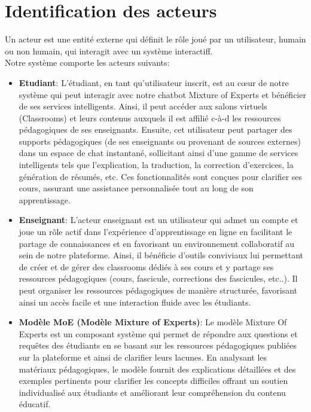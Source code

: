\section{Identification des acteurs}
\justifying
Un acteur est une entité externe qui définit le rôle joué par un utilisateur, humain ou non humain, qui interagit avec un système interactiff. \cite{acteur}\\
Notre système comporte les acteurs suivants:
\begin{itemize}[itemsep=2pt, parsep=2pt]
    \item \textbf{Etudiant}: L'étudiant, en tant qu'utilisateur inscrit, est au cœur de notre système qui peut interagir avec notre chatbot Mixture of Experts et bénéficier de ses services intelligents. Ainsi, il peut accéder aux salons virtuels (Classrooms) et leurs contenus auxquels il est affilié  c-à-d les ressources pédagogiques de ses enseignants. Ensuite, cet utilisateur peut partager des supports pédagogiques (de ses enseignants ou provenant de sources externes) dans un espace de chat instantané, sollicitant ainsi d'une gamme de services intelligents tels que l'explication, la traduction, la correction d'exercices, la génération de résumés, etc. Ces fonctionnalités sont conçues pour clarifier ses cours, assurant une assistance personnalisée tout au long de son apprentissage.
    \item \textbf{Enseignant}:  L'acteur enseignant est un utilisateur qui admet un compte et joue un rôle actif dans l'expérience d'apprentissage en ligne en facilitant le partage de connaissances et en favorisant un environnement collaboratif au sein de notre plateforme. Ainsi, il bénéficie d'outils conviviaux lui permettant de créer et de gérer des classrooms dédiés à ses cours et y partage ses ressources pédagogiques (cours, fascicule, corrections des fascicules, etc..). Il peut organiser les ressources pédagogiques de manière structurée, favorisant ainsi un accès facile et une interaction fluide avec les étudiants.
    \item \textbf{Modèle MoE (Modèle Mixture of Experts)}:  Le modèle Mixture Of Experts est un composant système qui permet de répondre aux questions et requêtes des étudiants en se basant sur les ressources pédagogiques publiées sur la plateforme et ainsi de clarifier leurs lacunes. En analysant les matériaux pédagogiques, le modèle fournit des explications détaillées et des exemples pertinents pour clarifier les concepts difficiles offrant un soutien individualisé aux étudiants et améliorant leur compréhension du contenu éducatif.
\end{itemize}

